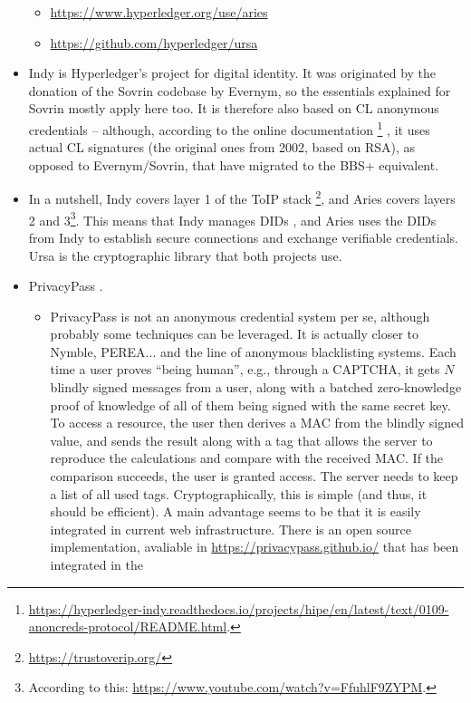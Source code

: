 \begin{itemize}
\begin{itemize}
  \item \url{https://www.hyperledger.org/use/aries}
  \item \url{https://github.com/hyperledger/ursa}
  \end{itemize}
\item Indy is Hyperledger's project for digital identity. It was originated by
  the donation of the Sovrin codebase by Evernym, so the essentials explained
  for Sovrin mostly apply here too. It is therefore also based on CL anonymous
  credentials -- although, according to the online documentation%
  \footnote{\url{https://hyperledger-indy.readthedocs.io/projects/hipe/en/latest/text/0109-anoncreds-protocol/README.html}.}%
  , it uses actual CL signatures (the original ones from 2002, based on RSA), as
  opposed to Evernym/Sovrin, that have migrated to the BBS+ equivalent.
\item In a nutshell, Indy covers layer 1 of the ToIP stack%
  \footnote{\url{https://trustoverip.org/}}, and Aries
  covers layers 2 and 3\footnote{According to this:
    \url{https://www.youtube.com/watch?v=FfuhlF9ZYPM}.}. This means that Indy
  manages DIDs , and Aries uses the DIDs from Indy to establish
  secure connections and exchange verifiable credentials. Ursa is the
  cryptographic library that both projects use.
\item PrivacyPass \cite{dgs+18}.
  \begin{itemize}
  \item PrivacyPass is not an anonymous credential system per se, although
    probably some techniques can be leveraged. It is actually closer to
    Nymble, PEREA... and the line of anonymous blacklisting systems. Each
    time a user proves ``being human'', e.g., through a CAPTCHA, it gets
    $N$ blindly signed messages from a user, along with a batched
    zero-knowledge proof of knowledge of all of them being signed with the
    same secret key. To access a resource, the user then derives a MAC
    from the blindly signed value, and sends the result along with a tag
    that allows the server to reproduce the calculations and compare with
    the received MAC. If the comparison succeeds, the user is granted access.
    The server needs to keep a list of all used tags. Cryptographically, this
    is simple (and thus, it should be efficient). A main advantage seems to
    be that it is easily integrated in current web infrastructure. There is an
    open source implementation, avaliable in
    \url{https://privacypass.github.io/} that has been integrated in the

\end{itemize}
\end{itemize}

